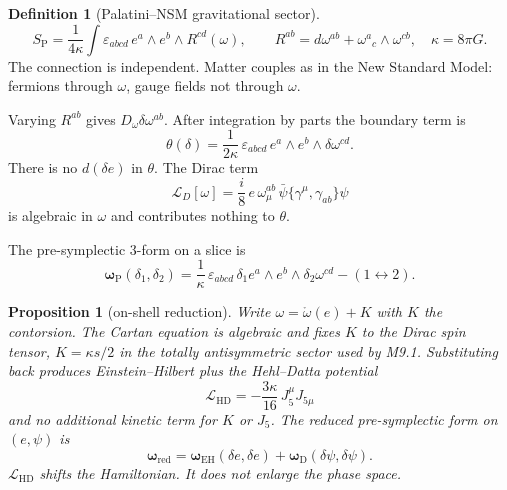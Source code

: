\documentclass[11pt]{article}
\newtheorem{proposition}[theorem]{Proposition}
\theoremstyle{definition}
\newtheorem{definition}[theorem]{Definition}
\begin{document}
\begin{definition}[Palatini--NSM gravitational sector]
\begin{equation}
S_{\mathrm{P}}
=
\frac{1}{4\kappa}
\int\varepsilon_{abcd}\,e^a\wedge e^b\wedge R^{cd}(\omega),
\qquad
R^{ab}=d\omega^{ab}+\omega^a{}_c\wedge\omega^{cb},
\quad
\kappa=8\pi G.
\label{eq:pal}
\end{equation}
The connection is independent. Matter couples as in the New Standard
Model: fermions through $\omega$, gauge fields not through $\omega$.
\end{definition}

Varying $R^{ab}$ gives $D_\omega\delta\omega^{ab}$. After integration
by parts the boundary term is
\begin{equation}
\theta(\delta)
=
\frac{1}{2\kappa}\,\varepsilon_{abcd}\,e^a\wedge e^b\wedge\delta\omega^{cd}.
\label{eq:theta}
\end{equation}
There is no $d(\delta e)$ in $\theta$. The Dirac term
\begin{equation}
\mathcal{L}_D[\omega]
=
\frac{i}{8}\,e\,\omega_\mu^{ab}\,\bar\psi\{\gamma^\mu,\gamma_{ab}\}\psi
\label{eq:diracw}
\end{equation}
is algebraic in $\omega$ and contributes nothing to $\theta$.

The pre-symplectic $3$-form on a slice is
\begin{equation}
\boldsymbol{\omega}_{\mathrm{P}}(\delta_1,\delta_2)
=
\frac{1}{\kappa}\,\varepsilon_{abcd}\,
\delta_1 e^a\wedge e^b\wedge\delta_2\omega^{cd}
-
(1\leftrightarrow 2).
\label{eq:omegaP}
\end{equation}

\begin{proposition}[on-shell reduction]
\label{prop:red}
Write $\omega=\mathring{\omega}(e)+K$ with $K$ the contorsion.
The Cartan equation is algebraic and fixes $K$ to the Dirac spin
tensor, $K=\kappa s/2$ in the totally antisymmetric sector used by
M9.1. Substituting back produces Einstein--Hilbert plus the
Hehl--Datta potential
\begin{equation}
\mathcal{L}_{\mathrm{HD}}
=
-\frac{3\kappa}{16}\,J_5^\mu J_{5\mu}
\label{eq:HD}
\end{equation}
and no additional kinetic term for $K$ or $J_5$. The reduced
pre-symplectic form on $(e,\psi)$ is
\begin{equation}
\boldsymbol{\omega}_{\mathrm{red}}
=
\boldsymbol{\omega}_{\mathrm{EH}}(\delta e,\delta e)
+
\boldsymbol{\omega}_{\mathrm{D}}(\delta\psi,\delta\psi).
\label{eq:omred}
\end{equation}
$\mathcal{L}_{\mathrm{HD}}$ shifts the Hamiltonian. It does not
enlarge the phase space.
\end{proposition}
\end{document}
